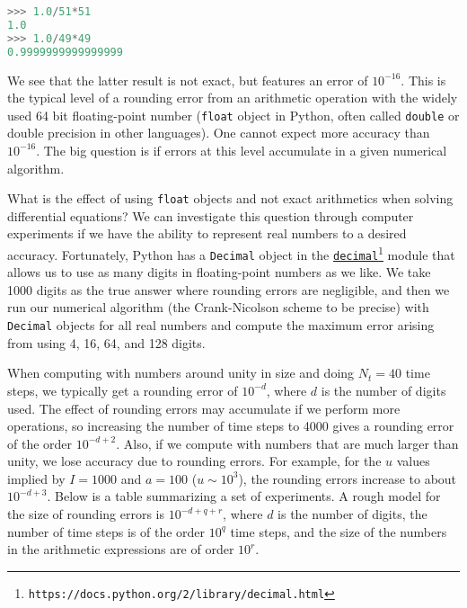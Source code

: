 \documentclass[graybox,sectrefs,envcountresetchap,open=right,final]{svmonodo}
\begin{document}
\begin{lstlisting}[language=Python,style=blue1_bluegreen]
>>> 1.0/51*51
1.0
>>> 1.0/49*49
0.9999999999999999
\end{lstlisting}
We see that the latter result is not exact, but features an error of
$10^{-16}$. This is the typical level of a rounding error from an
arithmetic operation with the widely used 64 bit floating-point number
(\texttt{float} object in Python, often called \texttt{double} or double precision
in other languages). One cannot expect more accuracy than $10^{-16}$.
The big question is if errors at this level accumulate in a given
numerical algorithm.

What is the effect of using \texttt{float} objects and not exact arithmetics
when solving differential equations? We can investigate this question
through computer experiments if we have the ability to represent real
numbers to a desired accuracy. Fortunately, Python has a \texttt{Decimal}
object in the \href{{https://docs.python.org/2/library/decimal.html}}{\nolinkurl{decimal}\footnote{\texttt{https://docs.python.org/2/library/decimal.html}}} module that allows us
to use as many digits in floating-point numbers as we like. We take
1000 digits as the true answer where rounding errors are negligible,
and then we run our numerical algorithm (the Crank-Nicolson scheme to
be precise) with \texttt{Decimal} objects for all real numbers and compute
the maximum error arising from using 4, 16, 64, and 128 digits.

When computing with numbers around unity in size and doing $N_t=40$
time steps, we typically get a rounding error of $10^{-d}$, where $d$
is the number of digits used. The effect of rounding errors may
accumulate if we perform more operations, so increasing the number of
time steps to 4000 gives a rounding error of the order $10^{-d+2}$.
Also, if we compute with numbers that are much larger than unity, we
lose accuracy due to rounding errors. For example, for the $u$ values
implied by $I=1000$ and $a=100$ ($u\sim 10^3$), the rounding errors
increase to about $10^{-d+3}$. Below is a table summarizing a set of
experiments. A rough model for the size of rounding errors is
$10^{-d+q+r}$, where $d$ is the number of digits, the number of time
steps is of the order $10^q$ time steps, and the size of the numbers
in the arithmetic expressions are of order $10^r$.
\end{document}
